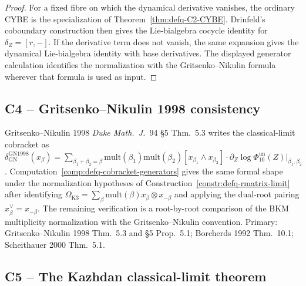 \begin{proof}
For a fixed fibre on which the dynamical derivative vanishes, the
ordinary CYBE is the specialization of
Theorem~\ref{thm:defq-C2-CYBE}. Drinfeld's coboundary construction
then gives the Lie-bialgebra cocycle identity for
\(\delta_Z=[r,-]\). If the derivative term does not vanish, the same
expansion gives the dynamical Lie-bialgebra identity with base
derivatives. The displayed generator calculation identifies the
normalization with the Gritsenko--Nikulin formula wherever that formula
is used as input.
\end{proof}

\subsection{C4 -- Gritsenko--Nikulin 1998 consistency}
\label{subsec:defq-C4-gn}

\begin{remark}
\label{rem:defq-gn-consistency}
Gritsenko--Nikulin 1998 \emph{Duke Math.\ J.}~94 \S5 Thm.~5.3 writes
the classical-limit cobracket as
$\delta_{\mathrm{GN}}^{\mathrm{GN1998}}(x_\beta) =
\sum_{\beta_1+\beta_2 = \beta}\mathrm{mult}(\beta_1)\mathrm{mult}(\beta_2)
[x_{\beta_1}\wedge x_{\beta_2}]\cdot
\partial_Z\log\Phi_{10}^{\mathrm{un}}(Z)|_{\beta_1, \beta_2}$.
Computation~\ref{comp:defq-cobracket-generators} gives the same formal
shape under
the normalization hypotheses of Construction~\ref{constr:defq-rmatrix-limit}
after identifying $\Omega_{\mathrm{K3}} =
\sum_\beta\mathrm{mult}(\beta) x_\beta\otimes x_{-\beta}$ and applying
the dual-root pairing $x_\beta^\vee = x_{-\beta}$. The remaining
verification is a root-by-root comparison of the BKM multiplicity
normalization with the Gritsenko--Nikulin convention.
Primary: Gritsenko--Nikulin 1998 Thm.~5.3 and \S5 Prop.~5.1;
Borcherds 1992 Thm.~10.1; Scheithauer 2000 Thm.~5.1.
\end{remark}

\subsection{C5 -- The Kazhdan classical-limit theorem}
\label{subsec:defq-C5-theorem}

